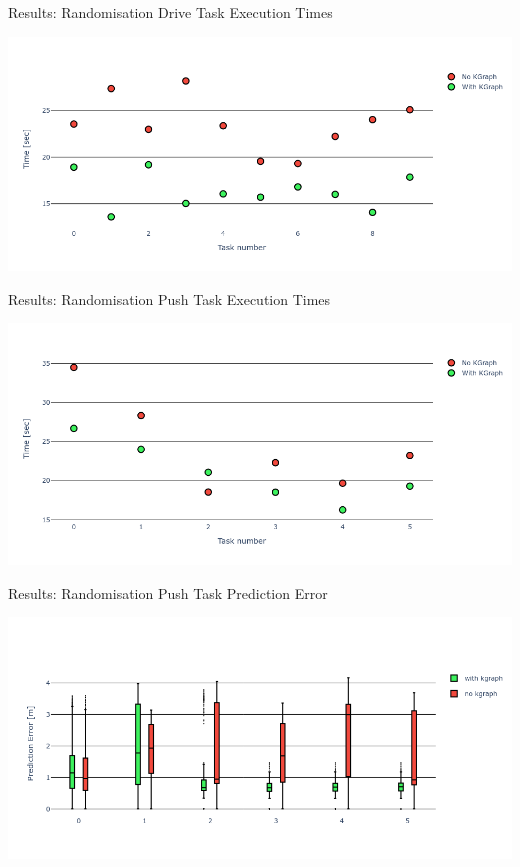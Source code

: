 \begin{frame}[fragile]{Results: Randomisation Drive Task Execution Times} %
\begin{center}
\includegraphics[width=1.0\textwidth]{figures/results/random_drive_time_vs}
\end{center}
\end{frame}

\begin{frame}[fragile]{Results: Randomisation Push Task Execution Times} %
\begin{center}
\includegraphics[width=1.0\textwidth]{figures/results/random_push_time_vs}
\end{center}
\end{frame}

\begin{frame}[fragile]{Results: Randomisation Push Task Prediction Error} %
\begin{center}
\includegraphics[width=1.0\textwidth]{figures/results/random_push_pe_vs}
\end{center}
\end{frame}


